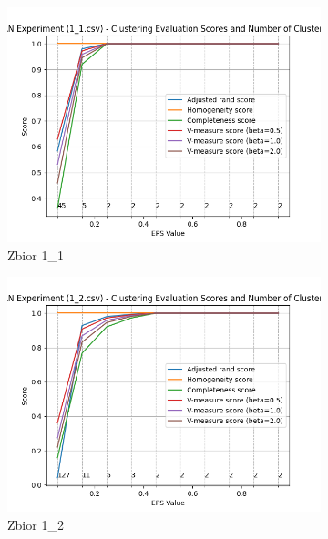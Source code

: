 \documentclass[12pt]{article}
\begin{document}
\begin{figure}[H]
    \centering
    \begin{subfigure}[b]{0.3\textwidth}
        \includegraphics[width=\linewidth]{img/exp_2/dbscan/1_1_scores.png}
        \caption{Zbior 1\_1}
    \end{subfigure}
    \hfill
    \begin{subfigure}[b]{0.3\textwidth}
        \includegraphics[width=\linewidth]{img/exp_2/dbscan/1_2_scores.png}
        \caption{Zbior 1\_2}
    \end{subfigure}
    \hfill
    \begin{subfigure}[b]{0.3\textwidth}

\end{subfigure}
\end{figure}
\end{document}

